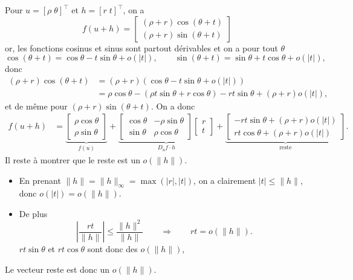 \proof
Pour $u = [\rho \; \theta]^\top$ et $h = [r \; t ]^\top$, on a
$$
f(u+h) = \left[\begin{array}{c} 
    (\rho+r) \cos(\theta +t) \\ (\rho+r) \sin(\theta +t) 
    \end{array} \right]
$$
or, les fonctions cosinus et sinus sont partout dérivables et on a pour tout $\theta$
$$
\cos(\theta +t) = \cos \theta - t \sin \theta + o(|t|), \qquad 
\sin(\theta +t) = \sin \theta + t \cos \theta + o(|t|),
$$
donc
\begin{align*}
  (\rho+r) \cos(\theta +t) 
    & = (\rho+r)\left(\cos \theta - t \sin \theta + o(|t|)\right) \\
    & = \rho \cos \theta - \left(\rho t \sin \theta + r \cos \theta\right)
    - rt \sin \theta + (\rho + r) o(|t|),
\end{align*}
et de même pour $(\rho+r) \sin(\theta +t)$.
On a donc
\begin{align*}
  f(u+h) 
  & =
  \underset{f(u)}{\underbrace{\left[\begin{array}{c}
    \rho \cos \theta \\ \rho \sin \theta
  \end{array} \right]}}
  +
  \underset{D_u f \cdot h}{\underbrace{\left[\begin{array}{rr} 
          \cos \theta & - \rho \sin \theta \\
          \sin \theta & \rho \cos \theta 
        \end{array} \right]
  \left[\begin{array}{c} r \\ t \end{array} \right]}}
  +
  \underset{\text{reste}}{\underbrace{\left[\begin{array}{r} 
          - rt \sin \theta + (\rho + r) o(|t|) \\
          rt \cos \theta + (\rho + r) o(|t|) 
        \end{array} \right]}}.
\end{align*}
Il reste à montrer que le reste est un $o(\|h\|)$. 
\begin{itemize}
  \item En prenant $\|h\| = \|h\|_\infty = \max(|r|, |t|)$, on a clairement $|t| \leq \|h\|$, donc $o(|t|) = o(\|h\|)$. 
  \item De plus
  $$
  \left|\frac{rt}{\|h\|}\right| 
  \leq \frac{\|h\|^2}{\|h\|}
  \qquad \Rightarrow \qquad 
  rt = o(\|h\|).
  $$
  $rt \sin \theta$ et $rt \cos \theta$ sont donc des $o(\|h\|)$, 
\end{itemize}
Le vecteur reste est donc un $o(\|h\|)$.
\eproof

